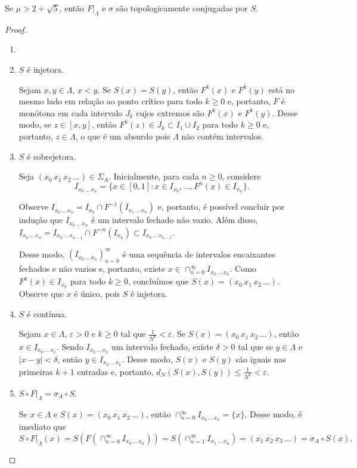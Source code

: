 \begin{proposition}
Se $\mu > 2 + \sqrt{5}$, então $F|_\Lambda$ e $\sigma$ são topologicamente conjugadas por $S$.
\end{proposition}

\begin{proof}
\begin{enumerate}[label=\alph*)]\item[]
\item $S$ é injetora.

Sejam $x, y \in \Lambda$, $x < y$. Se $S(x) = S(y)$, então $F^k(x)$ e $F^k(y)$ está no mesmo lado em relação ao ponto crítico para todo $k \geq 0$ e, portanto, $F$ é monótona em cada intervalo $J_k$ cujos extremos são $F^k(x)$ e $F^k(y)$. Desse modo, se $z \in [x, y]$, então $F^k(z) \in J_k \subset I_1 \cup I_2$ para todo $k \geq 0$ e, portanto, $z \in \Lambda$, o que é um absurdo pois $\Lambda$ não contém intervalos.

\item $S$ é sobrejetora.

Seja $(x_0 \, x_1 \, x_2 \, \dots) \in \Sigma_A$. Inicialmente, para cada $n \geq 0$, considere
$$I_{x_0 \, \dots \, x_n} = \lbrace x \in [0,1] : x \in I_{x_0}, \dots, F^n(x) \in I_{x_n} \rbrace.$$

Observe $I_{x_0 \, \dots \, x_n} = I_{x_0} \cap F^{-1}(I_{x_1 \, \dots \, x_n})$ e, portanto, é possível concluir por indução que $I_{x_0 \, \dots \, x_n}$ é um intervalo fechado não vazio. Além disso, $I_{x_0 \, \dots \, x_n} = I_{x_0 \, \dots \, x_{n-1}} \cap F^{-n}(I_{x_n}) \subset I_{x_0 \, \dots \, x_{n-1}}$.

Desse modo, $(I_{x_0 \, \dots \, x_n})_{n=0}^\infty$ é uma sequência de intervalos encaixantes fechados e não vazios e, portanto, existe $x \in \cap_{n=0}^\infty I_{x_0 \, \dots \, x_n}$. Como $F^k(x) \in I_{x_k}$ para todo $k \geq 0$, concluímos que $S(x) = (x_0 \, x_1 \, x_2 \, \dots)$. Observe que $x$ é único, pois $S$ é injetora.

\item $S$ é contínua.

Sejam $x \in \Lambda$, $\varepsilon > 0$ e $k \geq 0$ tal que $\frac{1}{N^k} < \varepsilon$. Se $S(x) = (x_0 \, x_1 \, x_2 \, \dots)$, então $x \in I_{x_0 \, \dots \, x_k}$. Sendo $I_{x_0 \, \dots \, x_k}$ um intervalo fechado, existe $\delta > 0$ tal que se $y \in \Lambda$ e $|x-y| < \delta$, então $y \in I_{x_0 \, \dots \, x_k}$. Desse modo, $S(x)$ e $S(y)$ são iguais nas primeiras $k+1$ entradas e, portanto, $d_N(S(x), S(y)) \leq \frac{1}{N^k} < \varepsilon$.

\item $S \circ F|_\Lambda = \sigma_A \circ S$.

Se $x \in \Lambda$ e $S(x) = (x_0 \, x_1 \, x_2 \, \dots)$, então $\cap_{n=0}^\infty I_{x_0 \, \dots \, x_n} = \lbrace x \rbrace$. Desse modo, é imediato que
$$ S \circ F|_{\Lambda}(x) = S(F(\cap_{n=0}^\infty I_{x_0 \, \dots \, x_n})) = S(\cap_{n=1}^\infty I_{x_1 \, \dots \, x_n}) = (x_1 \, x_2 \, x_3 \, \dots)  = \sigma_A \circ S(x).$$
\end{enumerate}
\end{proof}


